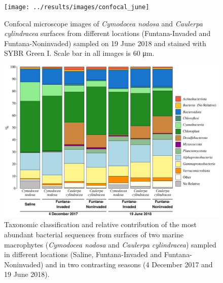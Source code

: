 \documentclass[12pt,]{article}
\begin{document}
\begin{figure}[ht]

{\centering \texttt{[image: ../results/images/confocal\_june]} 

}

\caption{Confocal microscope images of \textit{Cymodocea nodosa} and \textit{Caulerpa cylindracea} surfaces from different locations (Funtana-Invaded and Funtana-Noninvaded) sampled on 19 June 2018 and stained with SYBR Green I. Scale bar in all images is 60 \si{\um}.\label{micro_jun}}\label{fig:unnamed-chunk-3}
\end{figure}\newpage

\begin{figure}[ht]

{\centering \includegraphics[width=1\linewidth]{../results/figures/community_bar_plot} 

}

\caption{Taxonomic classification and relative contribution of the most abundant bacterial sequences from surfaces of two marine macrophytes (\textit{Cymodocea nodosa} and \textit{Caulerpa cylindracea}) sampled in different locations (Saline, Funtana-Invaded and Funtana-Noninvaded) and in two contrasting seasons (4 December 2017 and 19 June 2018).\label{community}}\label{fig:unnamed-chunk-4}
\end{figure}
\end{document}

